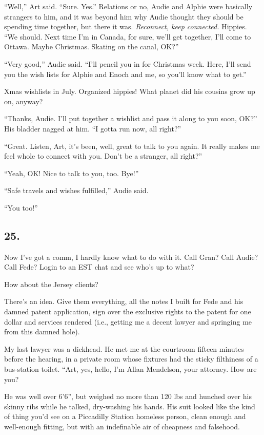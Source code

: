 “Well,” Art said. “Sure. Yes.” Relations or no, Audie and Alphie
were basically strangers to him, and it was beyond him why Audie
thought they should be spending time together, but there it was.
\emph{Reconnect, keep connected.} Hippies. “We should. Next time
I’m in Canada, for sure, we’ll get together, I’ll come to Ottawa.
Maybe Christmas. Skating on the canal, OK?”

“Very good,” Audie said. “I’ll pencil you in for Christmas week.
Here, I’ll send you the wish lists for Alphie and Enoch and me, so
you’ll know what to get.”

Xmas wishlists in July. Organized hippies! What planet did his
cousins grow up on, anyway?

“Thanks, Audie. I’ll put together a wishlist and pass it along to
you soon, OK?” His bladder nagged at him. “I gotta run now, all
right?”

“Great. Listen, Art, it’s been, well, great to talk to you again.
It really makes me feel whole to connect with you. Don’t be a
stranger, all right?”

“Yeah, OK! Nice to talk to you, too. Bye!”

“Safe travels and wishes fulfilled,” Audie said.

“You too!”

\subsection{25.}

Now I’ve got a comm, I hardly know what to do with it. Call Gran?
Call Audie? Call Fede? Login to an EST chat and see who’s up to
what?

How about the Jersey clients?

There’s an idea. Give them everything, all the notes I built for
Fede and his damned patent application, sign over the exclusive
rights to the patent for one dollar and services rendered (i.e.,
getting me a decent lawyer and springing me from this damned
hole).

My last lawyer was a dickhead. He met me at the courtroom fifteen
minutes before the hearing, in a private room whose fixtures had
the sticky filthiness of a bus-station toilet. “Art, yes, hello,
I’m Allan Mendelson, your attorney. How are you?

He was well over 6’6”, but weighed no more than 120 lbs and hunched
over his skinny ribs while he talked, dry-washing his hands. His
suit looked like the kind of thing you’d see on a Piccadilly
Station homeless person, clean enough and well-enough fitting, but
with an indefinable air of cheapness and falsehood.

